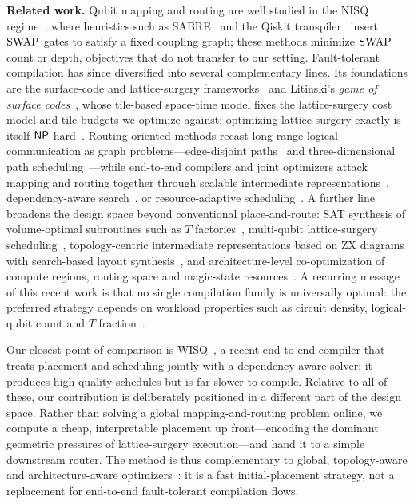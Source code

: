 \smallskip
\noindent\textbf{Related work.}
Qubit mapping and routing are well studied in the NISQ regime~\cite{siraichi2018qubit}, 
where heuristics such as SABRE~\cite{li2019sabre} and the Qiskit transpiler~\cite{qiskit} 
insert $\mathrm{SWAP}{}$ gates to satisfy a fixed coupling graph; these methods
minimize $\mathrm{SWAP}{}$ count or depth, objectives that do not transfer to
our setting. Fault-tolerant compilation has since diversified into several
complementary lines. Its foundations are the surface-code and lattice-surgery
frameworks~\cite{fowler2012surface,horsman2012lattice} and Litinski's
\emph{game of surface codes}~\cite{litinski2019game}, whose tile-based space-time
model fixes the lattice-surgery cost model and tile budgets we optimize against;
optimizing lattice surgery exactly is itself $\mathsf{NP}$-hard~\cite{herr2017nphard}.
Routing-oriented methods recast long-range logical communication as graph
problems---edge-disjoint paths~\cite{beverland2022surface} and three-dimensional
path scheduling~\cite{hamada2026routing3d}---while end-to-end compilers and joint
optimizers attack mapping and routing together through scalable intermediate
representations~\cite{watkins2024compiler}, dependency-aware
search~\cite{wisq}, or resource-adaptive scheduling~\cite{zhu2024ecmas}. A
further line broadens the design space beyond conventional place-and-route: SAT
synthesis of volume-optimal subroutines such as $T$ 
factories~\cite{tan2024satscalpel}, multi-qubit lattice-surgery
scheduling~\cite{silva2024multiqubit}, topology-centric intermediate
representations based on ZX diagrams with search-based layout
synthesis~\cite{zhou2026topols}, and architecture-level co-optimization of compute
regions, routing space and magic-state
resources~\cite{kan2025sparo,bharadwaj2026qomet}. A recurring message of this
recent work is that no single compilation family is universally optimal: the
preferred strategy depends on workload properties such as circuit density,
logical-qubit count and $T$ fraction~\cite{leblond2025comparison}.

Our closest point of comparison is WISQ~\cite{wisq}, a recent end-to-end compiler
that treats placement and scheduling jointly with a dependency-aware solver; it
produces high-quality schedules but is far slower to compile. Relative to all of
these, our contribution is deliberately positioned in a different part of the
design space. Rather than solving a global mapping-and-routing problem online, we
compute a cheap, interpretable placement up front---encoding the dominant
geometric pressures of lattice-surgery execution---and hand it to a simple
downstream router. The method is thus complementary to global, topology-aware and
architecture-aware optimizers~\cite{wisq,kan2025sparo,zhou2026topols}: it is a
fast initial-placement strategy, not a replacement for end-to-end fault-tolerant
compilation flows.

